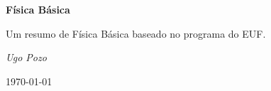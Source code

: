 \begin{titlepage}

    \centering
    \vspace{3.5cm}
    {\huge\bfseries Física Básica\par}
    \vspace{2cm}
    {\Large Um resumo de Física Básica baseado no programa do EUF.\par}
    \vfill
    {\Large\itshape Ugo Pozo \par}

    \vfill
    {\large \today\par}

\end{titlepage}